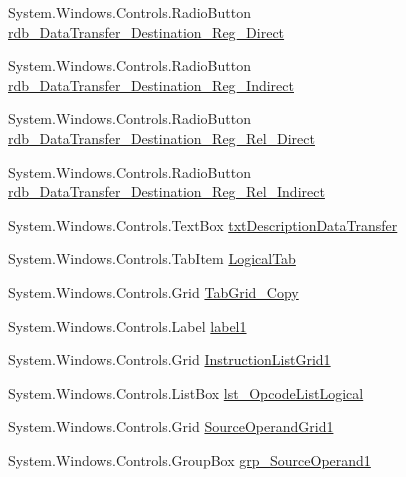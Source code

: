 \begin{DoxyCompactItemize}
\item 
System.\+Windows.\+Controls.\+Radio\+Button \hyperlink{class_c_p_u___o_s___simulator_1_1_instructions_window_a89197641f27fbf493623f5ff05ac12b7}{rdb\+\_\+\+Data\+Transfer\+\_\+\+Destination\+\_\+\+Reg\+\_\+\+Direct}
\item 
System.\+Windows.\+Controls.\+Radio\+Button \hyperlink{class_c_p_u___o_s___simulator_1_1_instructions_window_ab79bc59f00cae9375e82d2cdfdc1f246}{rdb\+\_\+\+Data\+Transfer\+\_\+\+Destination\+\_\+\+Reg\+\_\+\+Indirect}
\item 
System.\+Windows.\+Controls.\+Radio\+Button \hyperlink{class_c_p_u___o_s___simulator_1_1_instructions_window_a2f18045f068849ae31196d3c45a02b17}{rdb\+\_\+\+Data\+Transfer\+\_\+\+Destination\+\_\+\+Reg\+\_\+\+Rel\+\_\+\+Direct}
\item 
System.\+Windows.\+Controls.\+Radio\+Button \hyperlink{class_c_p_u___o_s___simulator_1_1_instructions_window_a7faa15ce177da40e9e73fe0fe4cb9948}{rdb\+\_\+\+Data\+Transfer\+\_\+\+Destination\+\_\+\+Reg\+\_\+\+Rel\+\_\+\+Indirect}
\item 
System.\+Windows.\+Controls.\+Text\+Box \hyperlink{class_c_p_u___o_s___simulator_1_1_instructions_window_a58152c12c2022edc73b39c1f95ec7ba4}{txt\+Description\+Data\+Transfer}
\item 
System.\+Windows.\+Controls.\+Tab\+Item \hyperlink{class_c_p_u___o_s___simulator_1_1_instructions_window_a06c53026f495bcbdad82e84bbcb6611c}{Logical\+Tab}
\item 
System.\+Windows.\+Controls.\+Grid \hyperlink{class_c_p_u___o_s___simulator_1_1_instructions_window_a0f8731825bc5369e0328b2b9580e9b67}{Tab\+Grid\+\_\+\+Copy}
\item 
System.\+Windows.\+Controls.\+Label \hyperlink{class_c_p_u___o_s___simulator_1_1_instructions_window_a499640eb8a98693f1833dad30f5d8cb4}{label1}
\item 
System.\+Windows.\+Controls.\+Grid \hyperlink{class_c_p_u___o_s___simulator_1_1_instructions_window_a8f09b0005016c225169d7e9dd2724053}{Instruction\+List\+Grid1}
\item 
System.\+Windows.\+Controls.\+List\+Box \hyperlink{class_c_p_u___o_s___simulator_1_1_instructions_window_a61ee2cb0ba7197963b1138848778cd3c}{lst\+\_\+\+Opcode\+List\+Logical}
\item 
System.\+Windows.\+Controls.\+Grid \hyperlink{class_c_p_u___o_s___simulator_1_1_instructions_window_a3f9d1afc4455fa6b06c6fab3cdb6aeec}{Source\+Operand\+Grid1}
\item 
System.\+Windows.\+Controls.\+Group\+Box \hyperlink{class_c_p_u___o_s___simulator_1_1_instructions_window_a74e13776576d1a6ee5767e3fc8f6ec7f}{grp\+\_\+\+Source\+Operand1}

\end{DoxyCompactItemize}
